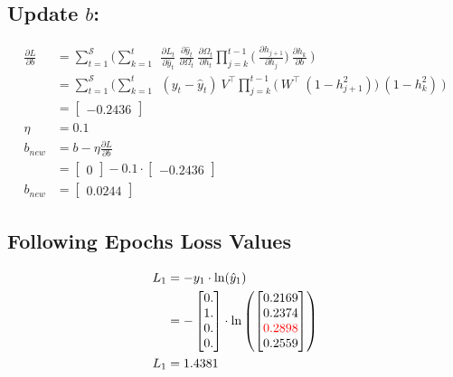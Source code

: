 \documentclass{article}
\begin{document}
\subsection{Update $b$:}
\begin{align*}
     \frac{\partial L}{ \partial{b}} &= \sum_{t=1}^{\mathcal{S}} 
	\bigg(	
	 \sum_{k=1}^{t} ~
	~\frac{\partial L_t}{\partial \hat{y}_t}
        ~\frac{\partial \hat{y}_t}{\partial \Omega_t}
	~\frac{\partial \Omega_t}{\partial h_t}
        \prod_{j=k}^{t-1} \bigg(
	~\frac{\partial h_{j+1}}{\partial h_{j}}
        \bigg)
	~\frac{\partial h_k}{\partial b}~
	\bigg) \\
  &= \sum_{t=1}^{\mathcal{S}} 
	\bigg(	
	 \sum_{k=1}^{t} ~
	~(y_t - \hat{y}_t)
	~V^\top
        \prod_{j=k}^{t-1} \bigg(
	~W^\top ~ (1 - h_{j+1}^2)
        \bigg)
	~(1-h_k^2)~
	\bigg) \\
 &=\begin{bmatrix}
-0.2436
\end{bmatrix} \\
\eta &= 0.1\\
b_{new} &= b - \eta \frac{\partial L}{\partial b}\\
 &= \begin{bmatrix}
0
\end{bmatrix}- 0.1 \cdot \begin{bmatrix}
-0.2436 \end{bmatrix} \\
b_{new} &= \begin{bmatrix}
0.0244
\end{bmatrix}
\end{align*}

\subsection{Following Epochs Loss Values}

\begin{align*}
    L_1 &= -y_1 \cdot \ln(\hat{y}_1) \\
    &= -\begin{bmatrix} 0. \\ 1. \\ 0. \\ 0. \end{bmatrix} \cdot \ln\left(\begin{bmatrix} 0.2169 \\ 0.2374 \\ \textcolor{red}{0.2898} \\ 0.2559 \end{bmatrix}\right) \\
    L_1 &= 1.4381
\end{align*}
\end{document}
